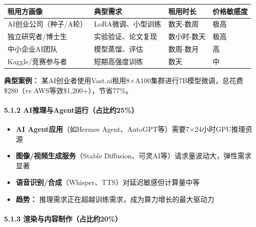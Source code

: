 \documentclass[UTF8,a4paper,12pt]{ctexart}
\begin{document}
{\def\LTcaptype{none} %
\begin{longtable}[]{@{}llll@{}}
\toprule\noalign{}
租用方画像 & 典型需求 & 租用时长 & 价格敏感度 \\
\midrule\noalign{}
\endhead
\bottomrule\noalign{}
\endlastfoot
AI创业公司（种子/A轮） & LoRA微调、小型训练 & 数天-数周 & 极高 \\
独立研究者/博士生 & 实验验证、论文复现 & 数小时-数天 & 极高 \\
中小企业AI团队 & 模型蒸馏、评估 & 数周-数月 & 高 \\
Kaggle/竞赛参与者 & 短期高强度训练 & 数天 & 中 \\
\end{longtable}
}

\textbf{典型案例：}
某AI创业者使用Vast.ai租用8×A100集群进行7B模型微调，总花费\$280（vs
AWS等效\$1,200+），节省77\%。

\paragraph{5.1.2
AI推理与Agent运行（占比约25\%）}\label{aiux63a8ux7406ux4e0eagentux8fd0ux884cux5360ux6bd4ux7ea625}

\begin{itemize}
\tightlist
\item
  \textbf{AI Agent应用}（如Hermes
  Agent、AutoGPT等）需要7×24小时GPU推理资源
\item
  \textbf{图像/视频生成服务}（Stable
  Diffusion、可灵AI等）请求量波动大，弹性需求显著
\item
  \textbf{语音识别/合成}（Whisper、TTS）对延迟敏感但计算量中等
\item
  \textbf{趋势：} 推理需求正在超越训练需求，成为算力增长的最大驱动力
\end{itemize}

\paragraph{5.1.3
渲染与内容制作（占比约20\%）}\label{ux6e32ux67d3ux4e0eux5185ux5bb9ux5236ux4f5cux5360ux6bd4ux7ea620}
\end{document}
